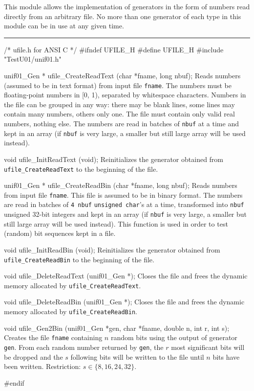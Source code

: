 
This module allows the implementation of generators in the form of numbers
read directly from an arbitrary file. No more than one generator of each
 type in this module can be in use at any given time.


\bigskip
\hrule
\code\hide
/* ufile.h for ANSI C */
#ifndef UFILE_H
#define UFILE_H
\endhide
#include "TestU01/unif01.h"


unif01_Gen * ufile_CreateReadText (char *fname, long nbuf);
\endcode
  \tab  Reads numbers (assumed to be in text format) from input file
   \texttt{fname}. %
   The numbers must be floating-point numbers in [0, 1), separated by
   whitespace characters. Numbers in the file can be grouped in any way:
   there may be blank lines, some lines may contain many numbers, others
   only one. The file must contain only valid real numbers, nothing else.
   The numbers are read in batches of {\tt nbuf} at a time and kept in an array
   (if {\tt nbuf} is very large, a smaller but still large array will be used
   instead).
 \endtab
\code


void ufile_InitReadText (void);
\endcode
  \tab Reinitializes the generator obtained from {\tt ufile\_CreateReadText}
   to the beginning of the file.
  \endtab
\code


unif01_Gen * ufile_CreateReadBin (char *fname, long nbuf);
\endcode
  \tab  Reads numbers from input file \texttt{fname}. This file is assumed
   to be in binary format. The numbers are read in batches of {\tt 4 nbuf}
  \texttt{unsigned char}'s at a time, transformed into  {\tt nbuf}  unsigned
   32-bit integers and kept in an array (if {\tt nbuf} is very large, a
    smaller but still large array will be used instead).
   This function is used in order to test (random)
   bit sequences kept in a file.
  \endtab
\code


void ufile_InitReadBin (void);
\endcode
  \tab Reinitializes the generator obtained from {\tt ufile\_CreateReadBin}
   to the beginning of the file.
  \endtab


\code

void ufile_DeleteReadText (unif01_Gen *);
\endcode
  \tab Closes the file and frees the dynamic memory allocated by
  \texttt{ufile\_CreateReadText}.
  \endtab
\code


void ufile_DeleteReadBin (unif01_Gen *);
\endcode
  \tab Closes the file and frees the dynamic memory allocated by
  \texttt{ufile\_CreateReadBin}.
  \endtab


\code

void ufile_Gen2Bin (unif01_Gen *gen, char *fname, double n, int r, int s);
\endcode
  \tab Creates the file {\tt fname} containing $n$ random bits using the
  output of generator {\tt gen}. From each random number
  returned by {\tt gen}, the $r$ most significant bits will be dropped
  and the $s$ following bits will be written to the file until $n$ bits
  have been written. Restriction: $s \in \{ 8, 16, 24, 32 \}$.
  \endtab

\code
\hide
#endif
\endhide
\endcode
